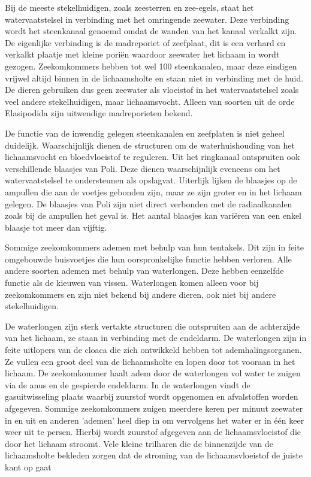 Bij de meeste stekelhuidigen, zoals zeesterren en zee-egels, staat het watervaatstelsel in verbinding met het omringende zeewater.
Deze verbinding wordt het steenkanaal genoemd omdat de wanden van het kanaal verkalkt zijn.
De eigenlijke verbinding is de madreporiet of zeefplaat, dit is een verhard en verkalkt plaatje met kleine poriën waardoor zeewater het lichaam in wordt gezogen.
Zeekomkommers hebben tot wel 100 steenkanalen, maar deze eindigen vrijwel altijd binnen in de lichaamsholte en staan niet in verbinding met de huid.
De dieren gebruiken dus geen zeewater als vloeistof in het watervaatstelsel zoals veel andere stekelhuidigen, maar lichaamsvocht.
Alleen van soorten uit de orde Elasipodida zijn uitwendige madreporieten bekend.

De functie van de inwendig gelegen steenkanalen en zeefplaten is niet geheel duidelijk.
Waarschijnlijk dienen de structuren om de waterhuishouding van het lichaamsvocht en bloedvloeistof te reguleren.
Uit het ringkanaal ontspruiten ook verschillende blaasjes van Poli.
Deze dienen waarschijnlijk eveneens om het watervaatstelsel te ondersteunen als opslagvat.
Uiterlijk lijken de blaasjes op de ampullen die aan de voetjes gebonden zijn, maar ze zijn groter en in het lichaam gelegen.
De blaasjes van Poli zijn niet direct verbonden met de radiaalkanalen zoals bij de ampullen het geval is.
Het aantal blaasjes kan variëren van een enkel blaasje tot meer dan vijftig.

Sommige zeekomkommers ademen met behulp van hun tentakels.
Dit zijn in feite omgebouwde buisvoetjes die hun oorspronkelijke functie hebben verloren.
Alle andere soorten ademen met behulp van waterlongen.
Deze hebben eenzelfde functie als de kieuwen van vissen.
Waterlongen komen alleen voor bij zeekomkommers en zijn niet bekend bij andere dieren, ook niet bij andere stekelhuidigen.

De waterlongen zijn sterk vertakte structuren die ontspruiten aan de achterzijde van het lichaam, ze staan in verbinding met de endeldarm.
De waterlongen zijn in feite uitlopers van de cloaca die zich ontwikkeld hebben tot ademhalingsorganen.
Ze vullen een groot deel van de lichaamsholte en lopen door tot vooraan in het lichaam.
De zeekomkommer haalt adem door de waterlongen vol water te zuigen via de anus en de gespierde endeldarm.
In de waterlongen vindt de gasuitwisseling plaats waarbij zuurstof wordt opgenomen en afvalstoffen worden afgegeven.
Sommige zeekomkommers zuigen meerdere keren per minuut zeewater in en uit en anderen 'ademen' heel diep in om vervolgens het water er in één keer weer uit te persen.
Hierbij wordt zuurstof afgegeven aan de lichaamsvloeistof die door het lichaam stroomt.
Vele kleine trilharen die de binnenzijde van de lichaamsholte bekleden zorgen dat de stroming van de lichaamsvloeistof de juiste kant op gaat

